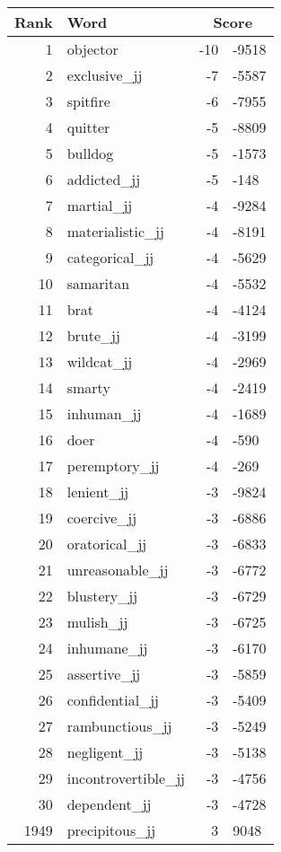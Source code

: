 \begin{longtable}[!htbp]{| rlr@{.}l |}
    \hline
    \textbf{Rank} & \textbf{Word} & \multicolumn{2}{c|}{\textbf{Score}} \\
    \hline
    \endhead
    1 & objector & -10 & -9518 \\
    2 & exclusive\_jj & -7 & -5587 \\
    3 & spitfire & -6 & -7955 \\
    4 & quitter & -5 & -8809 \\
    5 & bulldog & -5 & -1573 \\
    6 & addicted\_jj & -5 & -148 \\
    7 & martial\_jj & -4 & -9284 \\
    8 & materialistic\_jj & -4 & -8191 \\
    9 & categorical\_jj & -4 & -5629 \\
    10 & samaritan & -4 & -5532 \\
    11 & brat & -4 & -4124 \\
    12 & brute\_jj & -4 & -3199 \\
    13 & wildcat\_jj & -4 & -2969 \\
    14 & smarty & -4 & -2419 \\
    15 & inhuman\_jj & -4 & -1689 \\
    16 & doer & -4 & -590 \\
    17 & peremptory\_jj & -4 & -269 \\
    18 & lenient\_jj & -3 & -9824 \\
    19 & coercive\_jj & -3 & -6886 \\
    20 & oratorical\_jj & -3 & -6833 \\
    21 & unreasonable\_jj & -3 & -6772 \\
    22 & blustery\_jj & -3 & -6729 \\
    23 & mulish\_jj & -3 & -6725 \\
    24 & inhumane\_jj & -3 & -6170 \\
    25 & assertive\_jj & -3 & -5859 \\
    26 & confidential\_jj & -3 & -5409 \\
    27 & rambunctious\_jj & -3 & -5249 \\
    28 & negligent\_jj & -3 & -5138 \\
    29 & incontrovertible\_jj & -3 & -4756 \\
    30 & dependent\_jj & -3 & -4728 \\
    1949 & precipitous\_jj & 3 & 9048 \\

\end{longtable}
